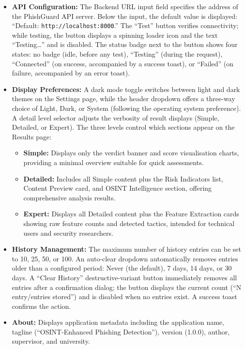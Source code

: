 \begin{itemize}
\item \textbf{API Configuration:} The Backend URL input field specifies the address of the PhishGuard API server. Below the input, the default value is displayed: ``Default: \texttt{http://localhost:8000}.'' The ``Test'' button verifies connectivity; while testing, the button displays a spinning loader icon and the text ``Testing\ldots'' and is disabled. The status badge next to the button shows four states: no badge (idle, before any test), ``Testing'' (during the request), ``Connected'' (on success, accompanied by a success toast), or ``Failed'' (on failure, accompanied by an error toast).
\item \textbf{Display Preferences:} A dark mode toggle switches between light and dark themes on the Settings page, while the header dropdown offers a three-way choice of Light, Dark, or System (following the operating system preference). A detail level selector adjusts the verbosity of result displays (Simple, Detailed, or Expert). The three levels control which sections appear on the Results page:
\begin{itemize}
    \item \textbf{Simple:} Displays only the verdict banner and score visualisation charts, providing a minimal overview suitable for quick assessments.
    \item \textbf{Detailed:} Includes all Simple content plus the Risk Indicators list, Content Preview card, and OSINT Intelligence section, offering comprehensive analysis results.
    \item \textbf{Expert:} Displays all Detailed content plus the Feature Extraction cards showing raw feature counts and detected tactics, intended for technical users and security researchers.
\end{itemize}
\item \textbf{History Management:} The maximum number of history entries can be set to 10, 25, 50, or 100. An auto-clear dropdown automatically removes entries older than a configured period: Never (the default), 7 days, 14 days, or 30 days. A ``Clear History'' destructive-variant button immediately removes all entries after a confirmation dialog; the button displays the current count (``N entry/entries stored'') and is disabled when no entries exist. A success toast confirms the action.
\item \textbf{About:} Displays application metadata including the application name, tagline (``OSINT-Enhanced Phishing Detection''), version (1.0.0), author, supervisor, and university.
\end{itemize}

